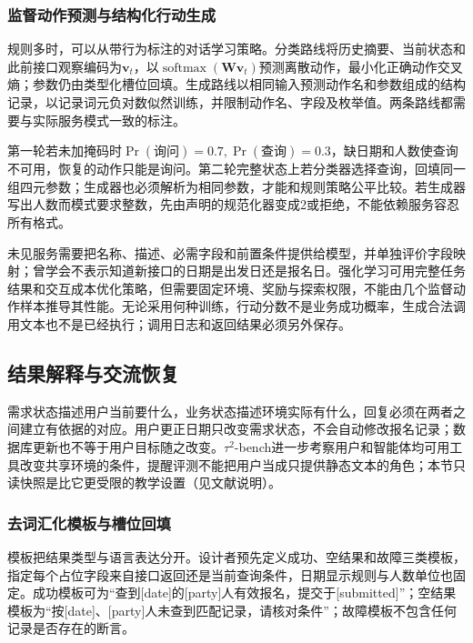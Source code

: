 \subsubsection{监督动作预测与结构化行动生成}
\label{sec:nlp-dialogue-learned-policy}

规则多时，可以从带行为标注的对话学习策略。分类路线将历史摘要、当前状态和此前接口观察编码为$\bm{v}_t$，以$\operatorname{softmax}(\bm{W}\bm{v}_t)$预测离散动作，最小化正确动作交叉熵；参数仍由类型化槽位回填。生成路线以相同输入预测动作名和参数组成的结构记录，以记录词元负对数似然训练，并限制动作名、字段及枚举值。两条路线都需要与实际服务模式一致的标注。

第一轮若未加掩码时$\Pr(\text{询问})=0.7,\Pr(\text{查询})=0.3$，缺日期和人数使查询不可用，恢复的动作只能是询问。第二轮完整状态上若分类器选择查询，回填同一组四元参数；生成器也必须解析为相同参数，才能和规则策略公平比较。若生成器写出人数而模式要求整数，先由声明的规范化器变成2或拒绝，不能依赖服务容忍所有格式。

未见服务需要把名称、描述、必需字段和前置条件提供给模型，并单独评价字段映射；曾学会不表示知道新接口的日期是出发日还是报名日。强化学习可用完整任务结果和交互成本优化策略，但需要固定环境、奖励与探索权限，不能由几个监督动作样本推导其性能。无论采用何种训练，行动分数不是业务成功概率，生成合法调用文本也不是已经执行；调用日志和返回结果必须另外保存。

\subsection{结果解释与交流恢复}
\label{sec:nlp-dialogue-response}

需求状态描述用户当前要什么，业务状态描述环境实际有什么，回复必须在两者之间建立有依据的对应。用户更正日期只改变需求状态，不会自动修改报名记录；数据库更新也不等于用户目标随之改变。$\tau^2$-bench进一步考察用户和智能体均可用工具改变共享环境的条件，提醒评测不能把用户当成只提供静态文本的角色；本节只读快照是比它更受限的教学设置（见文献说明）。

\subsubsection{去词汇化模板与槽位回填}
\label{sec:nlp-dialogue-template}

模板把结果类型与语言表达分开。设计者预先定义成功、空结果和故障三类模板，指定每个占位字段来自接口返回还是当前查询条件，日期显示规则与人数单位也固定。成功模板可为“查到[date]的[party]人有效报名，提交于[submitted]”；空结果模板为“按[date]、[party]人未查到匹配记录，请核对条件”；故障模板不包含任何记录是否存在的断言。

